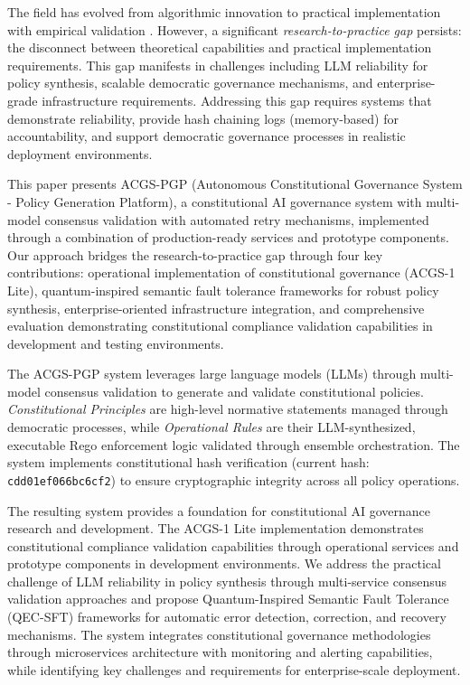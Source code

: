 \documentclass[manuscript,screen,9pt]{acmart}
\begin{document}
The field has evolved from algorithmic innovation to practical implementation with empirical validation \cite{StanfordJBLP2024AIGovernanceWeb3, StanfordLaw2025BulletProof}. However, a significant \textit{research-to-practice gap} persists: the disconnect between theoretical capabilities and practical implementation requirements. This gap manifests in challenges including LLM reliability for policy synthesis, scalable democratic governance mechanisms, and enterprise-grade infrastructure requirements. Addressing this gap requires systems that demonstrate reliability, provide hash chaining logs (memory-based) for accountability, and support democratic governance processes in realistic deployment environments.

This paper presents ACGS-PGP (Autonomous Constitutional Governance System - Policy Generation Platform), a constitutional AI governance system with multi-model consensus validation with automated retry mechanisms, implemented through a combination of production-ready services and prototype components. Our approach bridges the research-to-practice gap through four key contributions: operational implementation of constitutional governance (ACGS-1 Lite), quantum-inspired semantic fault tolerance frameworks for robust policy synthesis, enterprise-oriented infrastructure integration, and comprehensive evaluation demonstrating constitutional compliance validation capabilities in development and testing environments.

The ACGS-PGP system leverages large language models (LLMs) through multi-model consensus validation to generate and validate constitutional policies. \textit{Constitutional Principles} are high-level normative statements managed through democratic processes, while \textit{Operational Rules} are their LLM-synthesized, executable Rego enforcement logic validated through ensemble orchestration. The system implements constitutional hash verification (current hash: \texttt{cdd01ef066bc6cf2}) to ensure cryptographic integrity across all policy operations.

The resulting system provides a foundation for constitutional AI governance research and development. The ACGS-1 Lite implementation demonstrates constitutional compliance validation capabilities through operational services and prototype components in development environments. We address the practical challenge of LLM reliability in policy synthesis through multi-service consensus validation approaches and propose Quantum-Inspired Semantic Fault Tolerance (QEC-SFT) frameworks for automatic error detection, correction, and recovery mechanisms. The system integrates constitutional governance methodologies through microservices architecture with monitoring and alerting capabilities, while identifying key challenges and requirements for enterprise-scale deployment.
\end{document}

